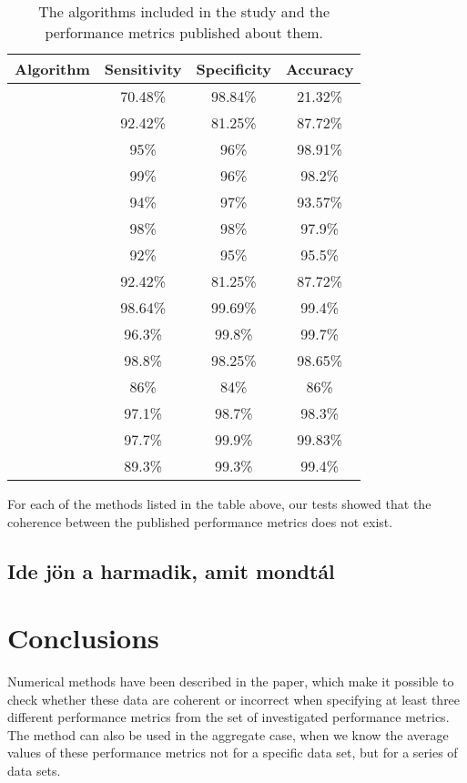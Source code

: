 \documentclass[5p, final]{elsarticle}
\begin{document}
\begin{table}[!h]
\begin{center}
\begin{tabular}{|c|c|c|c|}
    \hline
    Algorithm&Sensitivity&Specificity&Accuracy\\
    \hline
    \cite{exu01}&70.48\%&98.84\%&21.32\%\\
    \hline
    \cite{exu02}&92.42\%&81.25\%&87.72\%\\
    \hline
    \cite{exu03}&95\%&96\%&98.91\%\\
    \hline
    \cite{exu04}&99\%&96\%&98.2\%\\
    \hline
    \cite{exu05}&94\%&97\%&93.57\%\\
    \hline
    \cite{exu06}&98\%&98\%&97.9\%\\
    \hline
    \cite{exu07}&92\%&95\%&95.5\%\\
    \hline
    \cite{exu08}&92.42\%&81.25\%&87.72\%\\
    \hline
    \cite{exu09}&98.64\%&99.69\%&99.4\%\\
    \hline
    \cite{exu10}&96.3\%&99.8\%&99.7\%\\
    \hline
    \cite{exu11}&98.8\%&98.25\%&98.65\%\\
    \hline
    \cite{exu12}&86\%&84\%&86\%\\
    \hline
    \cite{exu13}&97.1\%&98.7\%&98.3\%\\
    \hline
    \cite{exu14}&97.7\%&99.9\%&99.83\%\\
    \hline
    \cite{exu15}&89.3\%&99.3\%&99.4\%\\
    \hline
\end{tabular}
\caption{The algorithms included in the study and the performance metrics published about them.}\label{table:5}
\end{center}
\end{table}

For each of the methods listed in the table above, our tests showed that the coherence between the published performance metrics does not exist.
    



\subsection{Ide jön a harmadik, amit mondtál}


\section{Conclusions}
\label{sec:conclusions}
Numerical methods have been described in the paper, which make it possible to check whether these data are coherent or incorrect when specifying at least three different performance metrics from the set of investigated performance metrics. The method can also be used in the aggregate case, when we know the average values of these performance metrics not for a specific data set, but for a series of data sets.
\end{document}
